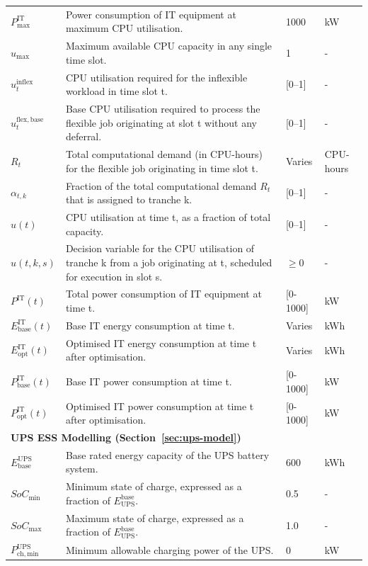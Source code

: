 \documentclass[lettersize,journal]{IEEEtran}
\begin{document}
{{\begin{longtable}{p{} p{} p{} p{}}
$P^{\mathrm{IT}}_{\mathrm{max}}$ & Power consumption of IT equipment at maximum CPU utilisation. & 1000 &kW \\
$u_{\max}$ & Maximum available CPU capacity in any single time slot. & 1 & - \\
$u_t^{\mathrm{inflex}}$ & CPU utilisation required for the inflexible workload in time slot t. & [0–1] & - \\
$u_t^{\mathrm{flex,base}}$ & Base CPU utilisation required to process the flexible job originating at slot t without any deferral. & [0–1] & - \\
$R_t$ & Total computational demand (in CPU-hours) for the flexible job originating in time slot t. & Varies & CPU-hours \\
$\alpha_{t,k}$ & Fraction of the total computational demand $R_t$ that is assigned to tranche k. & [0–1] & - \\
$u(t)$ & CPU utilisation at time t, as a fraction of total capacity. & [0–1] & - \\
$u(t,k,s)$ & Decision variable for the CPU utilisation of tranche k from a job originating at t, scheduled for execution in slot s. & $\geq 0$ & - \\
$P^{\mathrm{IT}}(t)$ & Total power consumption of IT equipment at time t. & [0-1000] &kW \\
$E^{\mathrm{IT}}_{\mathrm{base}}(t)$ & Base IT energy consumption at time t. & Varies &kWh \\
$E^{\mathrm{IT}}_{\mathrm{opt}}(t)$ & Optimised IT energy consumption at time t after optimisation. & Varies &kWh \\
$P^{\mathrm{IT}}_{\mathrm{base}}(t)$ & Base IT power consumption at time t. & [0-1000] &kW \\
$P^{\mathrm{IT}}_{\mathrm{opt}}(t)$ & Optimised IT power consumption at time t after optimisation. & [0-1000] &kW \\
\midrule
\multicolumn{4}{l}{\textbf{UPS ESS Modelling (Section~\ref{sec:ups-model})}} \\
\midrule
$E^{\mathrm{UPS}}_{\mathrm{base}}$ & Base rated energy capacity of the UPS battery system. & 600 &kWh \\
$SoC_{\min}$ & Minimum state of charge, expressed as a fraction of $E_{\mathrm{UPS}}^{\mathrm{base}}$. & 0.5 & - \\
$SoC_{\max}$ & Maximum state of charge, expressed as a fraction of $E_{\mathrm{UPS}}^{\mathrm{base}}$. & 1.0 & - \\
$P^{\mathrm{UPS}}_{\mathrm{ch,min}}$ & Minimum allowable charging power of the UPS. & 0 &kW \\

\end{longtable}}}
\end{document}
